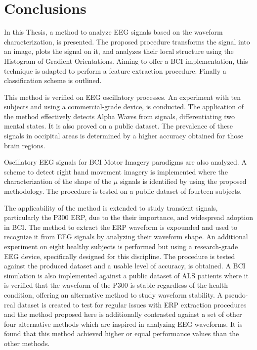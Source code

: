 \section{Conclusions}


In this Thesis, a method to analyze EEG signals based on the waveform characterization, is presented. The proposed procedure transforms the signal into an image, plots the signal on it, and analyzes their local structure using the Histogram of Gradient Orientations.   Aiming to offer a BCI implementation, this technique is adapted to perform a feature extraction procedure.  Finally a classification scheme is outlined.

This method is verified on EEG oscillatory processes.  An experiment with ten subjects and using a commercial-grade device, is conducted.  The application of the method effectively detects Alpha Waves from signals, differentiating two mental states.  It is also proved on a public dataset.  The prevalence of these signals in occipital areas is determined by a higher accuracy obtained for those brain regions.

Oscillatory EEG signals for BCI Motor Imagery paradigms are also analyzed.  A scheme to detect right hand movement imagery is implemented where the characterization of the shape of the $\mu$ signals is identified by using the proposed methodology.  The procedure is tested on a public dataset of fourteen subjects.

The applicability of the method is extended to study transient signals, particularly the P300 ERP,  due to the their importance, and widespread adoption in BCI.  The method to  extract the ERP waveform is expounded and used to recognize it from EEG signals by analyzing their waveform shape.  An additional experiment on eight healthy subjects is performed but using a research-grade EEG device, specifically designed for this discipline.  The procedure is tested against the produced dataset and a usable level of accuracy, is obtained.  A BCI simulation is also implemented against a public dataset of ALS patients where it is verified that the waveform of the P300 is stable regardless of the health condition, offering an alternative method to study waveform stability.  A pseudo-real dataset is created to test for regular issues with ERP extraction procedures and the method proposed here is additionally contrasted against a set of other four alternative methods which are inspired in analyzing EEG waveforms.  It is found that this method achieved higher or equal performance values than the other methods.

